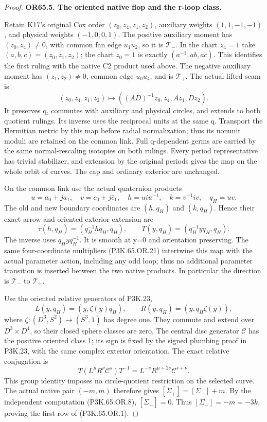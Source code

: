 \begin{proof}
\par\medskip\noindent\textbf{OR65.5. The oriented native flop and the r-loop class.}\par\nopagebreak[4]

Retain K17's original Cox order \((z_0,z_4,z_1,z_2)\), auxiliary
weights \((1,1,-1,-1)\), and physical weights \((-1,0,0,1)\).
The positive auxiliary moment has \((z_0,z_4)\ne0\), with common
fan edge \(u_1u_2\), so it is \(\mathcal T_-\). In the chart
\(z_4=1\) take \((a,b,c)=(z_0,z_1,z_2)\); the chart \(z_0=1\)
is exactly \((a^{-1},ab,ac)\). This identifies the first ruling
with the native C2 product used above. The negative auxiliary
moment has \((z_1,z_2)\ne0\), common edge \(u_0u_4\), and is
\(\mathcal T_+\). The actual lifted seam is
\[
 (z_0,z_4,z_1,z_2)\mapsto
       ((AD)^{-1}z_0,z_4,Az_1,Dz_2).                 \tag{P3K.65.OR.21}
\]
It preserves q, commutes with auxiliary and physical circles,
and extends to both quotient rulings. Its inverse uses the
reciprocal units at the same q. Transport the Hermitian metric
by this map before radial normalization; thus its nonunit moduli
are retained on the common link. Full q-dependent germs are
carried by the same normal-rescaling isotopies on both rulings.
Every period representative has trivial stabilizer, and extension
by the original periods gives the map on the whole orbit of curves.
The cap and ordinary exterior are unchanged.

On the common link use the actual quaternion products
\[
 u=a_0+ja_1,\quad v=c_0+j\bar c_1,\quad
 h=uiu^{-1},\quad k=v^{-1}iv,\quad q_H=uv.
\]
The old and new boundary coordinates are \((h,q_H)\) and
\((k,q_H)\). Hence their exact arrow and oriented exterior
extension are
\[
 \tau(h,q_H)=(q_H^{-1}h q_H,q_H),\qquad
 T(y,q_H)=(q_H^{-1}yq_H,q_H).                         \tag{P3K.65.OR.22}
\]
The inverse uses \(q_Hyq_H^{-1}\). It is smooth at y=0 and
orientation preserving. The same four-coordinate multipliers
(P3K.65.OR.21) intertwine this map with the actual parameter action,
including any odd loop; thus no additional parameter transition
is inserted between the two native products. In particular the
direction is \(\mathcal T_-\) to \(\mathcal T_+\).

Use the oriented relative generators of P3K.23,
\[
 L(y,q_H)=(y,\zeta(y)q_H),\qquad
 R(y,q_H)=(y,q_H\zeta(y)),
\]
where \(\zeta:(D^3,S^2)\to(S^3,1)\) has degree one. They
commute and extend over \(D^3\times D^4\), so their closed
sphere classes are zero. The central disc generator \(\mathcal C\)
has the positive oriented class 1; its sign is fixed by the signed
plumbing proof in P3K.23, with the same complex exterior orientation.
The exact relative conjugation is
\[
 T(L^\mu R^\nu\mathcal C^s)T^{-1}
       =L^{-\nu}R^{\mu+2\nu}\mathcal C^{s+\nu}.     \tag{P3K.65.OR.23}
\]
This group identity imposes no circle-quotient restriction on the
selected curve. The actual native pair \((-m,m)\) therefore
gives
\([\Sigma_+]=[\Sigma_-]+m\). By the independent computation
(P3K.65.OR.8), \([\Sigma_+]=0\). Thus
\([\Sigma_-]=-m=-3k\), proving the first row of (P3K.65.OR.1).


\end{proof}
